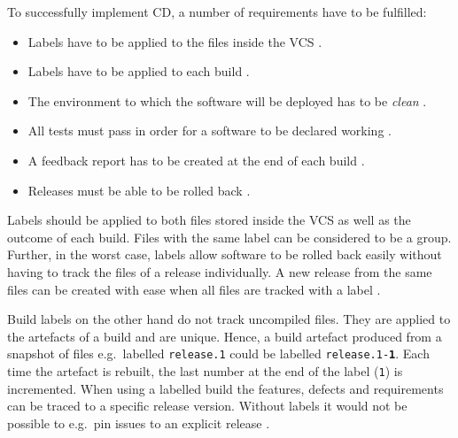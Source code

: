 To successfully implement \ac{CD}, a number of requirements have to be
fulfilled: 
\begin{itemize}
  \item Labels have to be applied to the files inside the \ac{VCS}
    \autocite[pp. 191-194]{MatyasContinuousIntegration2007}.
  \item Labels have to be applied to each build \autocite[pp.
    195f.]{MatyasContinuousIntegration2007}.
  \item The environment to which the software will be deployed has to be
    \textit{clean} \autocite[pp. 194f.]{MatyasContinuousIntegration2007}.
  \item All tests must pass in order for a software to be declared working
    \autocite[p. 196]{MatyasContinuousIntegration2007}.
  \item A feedback report has to be created at the end of each build
    \autocite[pp. 196-198]{MatyasContinuousIntegration2007}.
  \item Releases must be able to be rolled back \autocite[p.
    199]{MatyasContinuousIntegration2007}.
\end{itemize}

Labels should be applied to both files stored inside the \ac{VCS} as well as
the outcome of each build. Files with the same label can be considered to be a
group. Further, in the worst case, labels allow software to be rolled back
easily without having to track the files of a release individually. A new
release from the same files can be created with ease when all files are tracked
with a label \autocite[pp. 191-194]{MatyasContinuousIntegration2007}.

Build labels on the other hand do not track uncompiled files. They are applied
to the artefacts of a build and are unique. Hence, a build artefact produced
from a snapshot of files e.g.\ labelled \texttt{release.1}
could be labelled \texttt{release.1-\textbf{1}}. Each time
the artefact is rebuilt, the last number at the end of the label (\texttt{1})
is incremented. When using a labelled build the features, defects and
requirements can be traced to a specific release version. Without
labels it would not be possible to e.g.\ pin issues to an explicit release
\autocite[pp. 195f.]{MatyasContinuousIntegration2007}.

